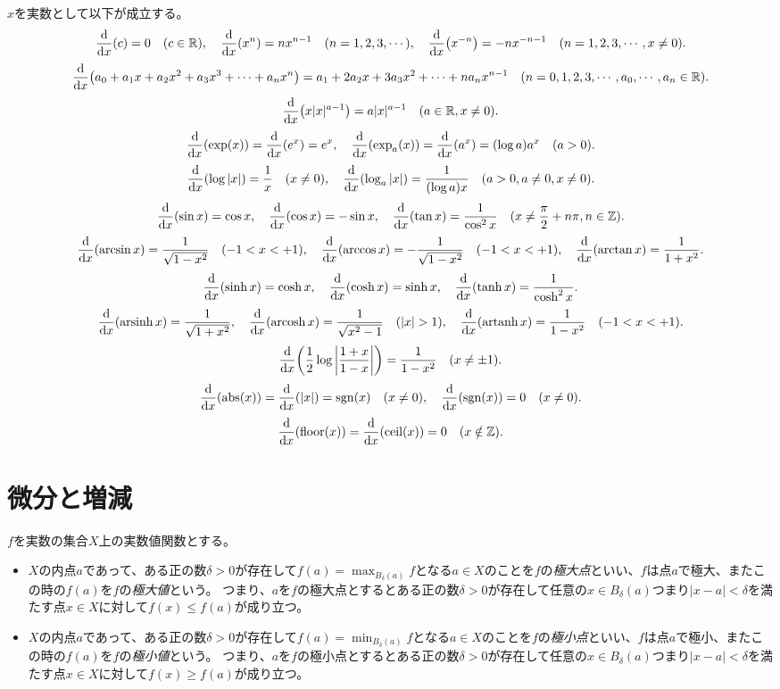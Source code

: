 \begin{proposition}[種々の関数の微分]
$x$を実数として以下が成立する。
$$
\dv{x}(c) = 0 \quad (c \in \mathbb{R}),
\quad \dv{x}(x^n) = n x^{n-1} \quad (n = 1, 2, 3, \cdots),
\quad \dv{x}(x^{-n}) = -n x^{-n-1} \quad (n = 1, 2, 3, \cdots, x \ne 0).
$$
$$
\dv{x}(a_0+a_1 x+a_2 x^2+a_3 x^3+\cdots+a_n x^n) = a_1+2 a_2 x+3 a_3 x^2+\cdots+n a_n x^{n-1} \quad (n = 0, 1, 2, 3, \cdots, a_0, \cdots, a_n \in \mathbb{R}).
$$
$$
\dv{x}(x|x|^{a-1}) = a |x|^{a-1} \quad (a \in \mathbb{R}, x \ne 0).
$$
$$
\dv{x}(\exp(x)) = \dv{x}(e^x) = e^x,
\quad \dv{x}(\exp_a(x)) = \dv{x}(a^x) = (\log a)a^x \quad (a > 0).
$$
$$
\dv{x}(\log|x|) = \frac{1}{x} \quad (x \ne 0),
\quad \dv{x}(\log_a|x|) = \frac{1}{(\log a)x} \quad (a > 0, a \ne 0, x \ne 0).
$$
$$
\dv{x}(\sin x) = \cos x,
\quad \dv{x}(\cos x) = -\sin x,
\quad \dv{x}(\tan x) = \frac{1}{\cos^2 x} \quad (x \ne \frac{\pi}{2}+n\pi, n \in \mathbb{Z}).
$$
$$
\dv{x}(\arcsin x) = \frac{1}{\sqrt{1-x^2}} \quad (-1 < x < +1),
\quad \dv{x}(\arccos x) = -\frac{1}{\sqrt{1-x^2}} \quad (-1 < x < +1),
\quad \dv{x}(\arctan x) = \frac{1}{1+x^2}.
$$
$$
\dv{x}(\sinh x) = \cosh x,
\quad \dv{x}(\cosh x) = \sinh x,
\quad \dv{x}(\tanh x) = \frac{1}{\cosh^2 x}.
$$
$$
\dv{x}(\operatorname{arsinh} x) = \frac{1}{\sqrt{1+x^2}},
\quad \dv{x}(\operatorname{arcosh} x) = \frac{1}{\sqrt{x^2-1}} \quad (|x| > 1),
\quad \dv{x}(\operatorname{artanh} x) = \frac{1}{1-x^2} \quad (-1 < x < +1).
$$
$$
\dv{x}\qty(\frac{1}{2}\log\abs{\frac{1+x}{1-x}}) = \frac{1}{1-x^2} \quad (x \ne \pm 1).
$$
$$
\dv{x}(\operatorname{abs}(x)) = \dv{x}(|x|) = \operatorname{sgn}(x) \quad (x \ne 0),
\quad \dv{x}(\operatorname{sgn}(x)) = 0 \quad (x \ne 0).
$$
$$
\dv{x}(\operatorname{floor}(x)) = \dv{x}(\operatorname{ceil}(x)) = 0 \quad (x \notin \mathbb{Z}).
$$
\end{proposition}

\section{微分と増減}

\begin{definition}[極大・極小]
$f$を実数の集合$X$上の実数値関数とする。
\begin{itemize}
\item
$X$の内点$a$であって、ある正の数$\delta > 0$が存在して$f(a) = \max_{B_\delta(a)} f$となる$a \in X$のことを$f$の\emph{極大点}といい、$f$は点$a$で極大、またこの時の$f(a)$を$f$の\emph{極大値}という。
つまり、$a$を$f$の極大点とするとある正の数$\delta > 0$が存在して任意の$x \in B_\delta(a)$つまり$|x-a| < \delta$を満たす点$x \in X$に対して$f(x) \le f(a)$が成り立つ。
\item
$X$の内点$a$であって、ある正の数$\delta > 0$が存在して$f(a) = \min_{B_\delta(a)} f$となる$a \in X$のことを$f$の\emph{極小点}といい、$f$は点$a$で極小、またこの時の$f(a)$を$f$の\emph{極小値}という。
つまり、$a$を$f$の極小点とするとある正の数$\delta > 0$が存在して任意の$x \in B_\delta(a)$つまり$|x-a| < \delta$を満たす点$x \in X$に対して$f(x) \ge f(a)$が成り立つ。
\end{itemize}
\end{definition}

